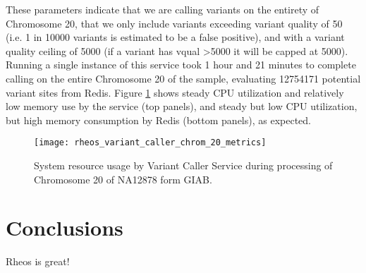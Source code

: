 These parameters indicate that we are calling variants on the entirety of Chromosome 20, that we only include variants exceeding variant quality of 50 (i.e. 1 in 10000 variants is estimated to be a false positive), and with a variant quality ceiling of 5000 (if a variant has vqual >5000 it will be capped at 5000). Running a single instance of this service took 1 hour and 21 minutes to complete calling on the entire Chromosome 20 of the sample, evaluating 12754171 potential variant sites from Redis. Figure \ref{fig:rheos_variant_caller_chrom20_metrics} shows steady CPU utilization and relatively low memory use by the service (top panels), and steady but low CPU utilization, but high memory consumption by Redis (bottom panels), as expected.

\begin{figure}[h!]
    \texttt{[image: rheos\_variant\_caller\_chrom\_20\_metrics]}
    \centering
    \caption {System resource usage by Variant Caller Service during processing of Chromosome 20 of NA12878 form GIAB.}
    \label{fig:rheos_variant_caller_chrom20_metrics}
\end{figure}




\section{Conclusions}
Rheos is great!